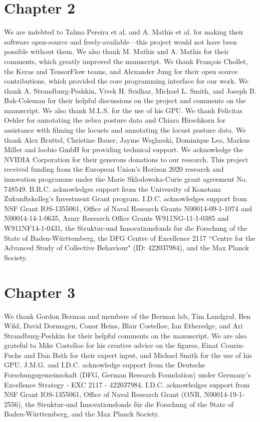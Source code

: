 \documentclass[11pt,a4paper,twoside]{book}
\begin{document}
\begin{doublespace}
\section*{Chapter 2}
We are indebted to Talmo Pereira et al. and A. Mathis et al. for making their software open-source and freely-available---this project would not have been possible without them. We also thank M. Mathis and A. Mathis for their comments, which greatly improved the manuscript. We thank Fran\c{c}ois Chollet, the Keras and TensorFlow teams, and Alexander Jung for their open source contributions, which provided the core programming interface for our work. We thank A. Strandburg-Peshkin, Vivek H. Sridhar, Michael L. Smith, and Joseph B. Bak-Coleman for their helpful discussions on the project and comments on the manuscript. We also thank M.L.S. for the use of his GPU. We thank Felicitas Oehler for annotating the zebra posture data and Chiara Hirschkorn for assistance with filming the locusts and annotating the locust posture data. We thank Alex Bruttel, Christine Bauer, Jayme Weglarski, Dominique Leo, Markus Miller and loobio GmbH for providing technical support. We acknowledge the NVIDIA Corporation for their generous donations to our research. This project received funding from the European Union's Horizon 2020 research and innovation programme under the Marie Sklodowska-Curie grant agreement No. 748549. B.R.C. acknowledges support from the University of Konstanz Zukunftskolleg's Investment Grant program. I.D.C. acknowledges support from NSF Grant IOS-1355061, Office of Naval Research Grants N00014-09-1-1074 and N00014-14-1-0635, Army Research Office Grants W911NG-11-1-0385 and W911NF14-1-0431, the Struktur-und Innovationsfonds fur die Forschung of the State of Baden-W\"urttemberg, the DFG Centre of Excellence 2117 “Centre for the Advanced Study of Collective Behaviour" (ID: 422037984), and the Max Planck Society.

\section*{Chapter 3}
We thank Gordon Berman and members of the Berman lab, Tim Landgraf, Ben Wild, David Dormagen, Conor Heins, Blair Costelloe, Ian Etheredge, and Ari Strandburg-Peshkin for their helpful comments on the manuscript. We are also grateful to Mike Costelloe for his creative advice on the figures, Einat Couzin-Fuchs and Dan Bath for their expert input, and Michael Smith for the use of his GPU. J.M.G. and I.D.C. acknowledge support from the Deutsche Forschungsgemeinschaft
(DFG, German Research Foundation) under Germany’s Excellence Strategy - EXC 2117 - 422037984. I.D.C. acknowledges support from NSF Grant IOS-1355061, Office of Naval Research Grant (ONR, N00014-19-1-2556), the Struktur-und Innovationsfonds f\"ur die Forschung of the State of Baden-W\"urttemberg, and the Max Planck Society.



\end{doublespace}
\end{document}
